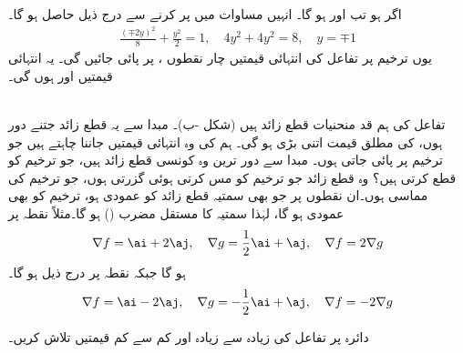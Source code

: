   اگر  ہو تب  اور  ہو گا۔ انہیں مساوات  میں پر کرنے سے درج ذیل حاصل ہو گا۔
\begin{align*}
\frac{(\mp 2y)^2}{8}+\frac{y^2}{2}=1,\quad 4y^2+4y^2=8,\quad y=\mp 1
\end{align*}
یوں ترخیم پر تفاعل  کی انتہائی قیمتیں چار نقطوں  ،  پر پائی جائیں گی۔ یہ انتہائی قیمتیں  اور  ہوں گی۔ 

\\
تفاعل  کی ہم قد منحنیات قطع زائد  ہیں (شکل -ب)۔ مبدا سے یہ قطع زائد جتنے دور ہوں،  کی مطلق قیمت اتنی بڑی ہو گی۔ ہم  کی وہ  انتہائی قیمتیں جاننا چاہتے ہیں جو ترخیم  پر پائی جاتی ہوں۔ مبدا سے دور ترین وہ کونسی قطع زائد ہیں،   جو ترخیم کو قطع کرتی ہیں؟ وہ قطع زائد جو ترخیم کو مس کرتی  ہوئی گزرتی ہوں، جو ترخیم کی مماسی ہوں۔ان نقطوں پر جو بھی سمتیہ قطع زائد کو عمودی ہو، ترخیم کو بھی عمودی ہو گا، لہٰذا   سمتیہ  کا مستقل مضرب () ہو گا۔مثلاً  نقطہ  پر
\begin{align*}
\nabla f=\ai+2\aj,\quad \nabla g=\frac{1}{2}\ai+\aj,\quad \nabla f=2\nabla g
\end{align*}
ہو گا  جبکہ  نقطہ  پر درج ذیل ہو گا۔
\begin{align*}
\nabla f=\ai-2\aj,\quad \nabla g=-\frac{1}{2}\ai+\aj,\quad \nabla f= -2\nabla g
\end{align*}


دائرہ  پر تفاعل  کی زیادہ سے زیادہ اور کم سے کم قیمتیں تلاش کریں۔

